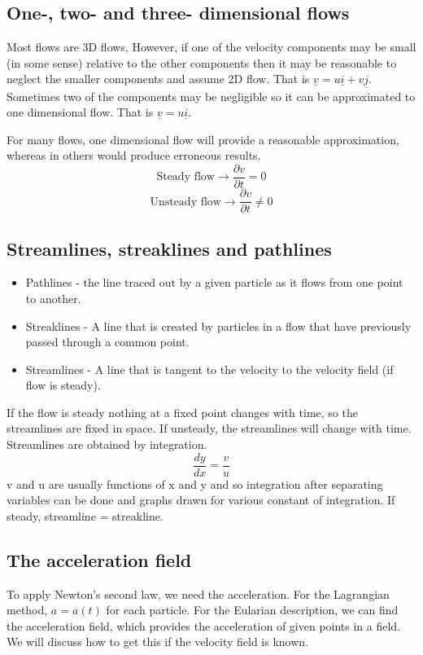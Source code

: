 \documentclass[class=report, crop=false, 12pt,a4paper]{standalone}
\begin{document}
\subsection{One-, two- and three- dimensional flows}
Most flows are 3D flows, However, if one of the velocity components may be small (in some sense) relative to the other components then it may be reasonable to neglect the smaller components and assume 2D flow. That is \( \underline{v} = u\underline{i} + v\underline{j} \). Sometimes two of the components may be negligible so it can be approximated to one dimensional flow. That is \( \underline{v} = u\underline{i} \).

For many flows, one dimensional flow will provide a reasonable approximation, whereas in others would produce erroneous results.
\[ \textrm{Steady flow} \rightarrow \frac{\partial v}{\partial t} = 0 \]
\[ \textrm{Unsteady flow} \rightarrow \frac{\partial v}{\partial t} \neq 0 \]
\subsection{Streamlines, streaklines and pathlines}
\begin{itemize}[noitemsep]
  \item Pathlines - the line traced out by a given particle as it flows from one point to another.
  \item Streaklines - A line that is created by particles in a flow that have previously passed through a common point.
  \item Streamlines - A line that is tangent to the velocity to the velocity field (if flow is steady).
\end{itemize}
If the flow is steady nothing at a fixed point changes with time, so the streamlines are fixed in space. If unsteady, the streamlines will change with time. Streamlines are obtained by integration. 
\[ \frac{dy}{dx} = \frac{v}{u} \]
v and u are usually functions of x and y and so integration after separating variables can be done and graphs drawn for various constant of integration. If steady, streamline = streakline.
\subsection{The acceleration field}
To apply Newton's second law, we need the acceleration. For the Lagrangian method, \( a = a(t) \) for each particle. For the Eularian description, we can find the acceleration field, which provides the acceleration of given points in a field. We will discuss how to get this if the velocity field is known. 
\end{document}
